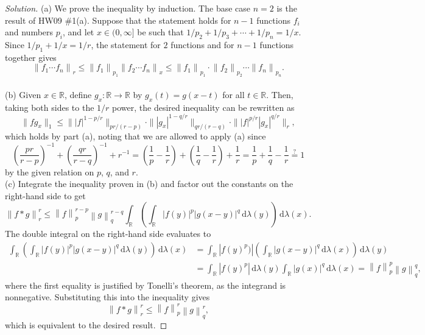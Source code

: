 \documentclass[10pt]{article}
\newcommand{\dd}{\,\mathrm{d}}
\providecommand{\RR}{\mathbb R}
\providecommand{\inv}{^{-1}}
\newenvironment{soln}{\begin{proof}[Solution]}{\end{proof}}
\providecommand{\abs}[1]{\left\lvert #1\right\rvert}
\providecommand{\norm}[1]{\left\| #1\right\|}
\providecommand{\smnorm}[1]{\| #1\|}
\begin{document}
\begin{soln}
    (a) We prove the inequality by induction. The base case $n=2$
    is the result of HW09 \#1(a). Suppose that the statement holds
    for $n - 1$ functions $f_i$ and numbers $p_i$,
    and let $x\in(0,\infty]$ be such that
    $1/{p_2} + 1/{p_3} + \cdots + 1/{p_n} = 1/x$. Since $1/p_1 + 1/x = 1/r$,
    the statement for $2$ functions and for $n-1$ functions together gives
    \begin{equation*}
	\norm{f_1\cdots f_n}_r \le \norm{f_1}_{p_1}\norm{f_2\cdots f_n}_{x}
	\le \norm{f_1}_{p_1}\cdot \norm{f_2}_{p_2}\cdots\norm{f_n}_{p_n}.
    \end{equation*}
    \\

    (b) Given $x\in\RR$, define $g_x\colon\RR\to\RR$ by
    $g_x(t) = g(x-t)$ for all $t\in\RR$. Then, taking both sides to the $1/r$ power,
    the desired inequality can be rewritten as
    \begin{equation*}
	\smnorm{fg_x}_1 \le \smnorm{\abs{f}^{1-p/r}}_{pr/(r-p)}\cdot
	\smnorm{\abs{g_x}^{1-q/r}}_{qr/(r-q)}\cdot
	\smnorm{\abs{f}^{p/r}\abs{g_x}^{q/r}}_{r},
    \end{equation*}
    which holds by part (a), noting that we are allowed to apply (a) since
    \begin{equation*}
        \left(\frac{pr}{r-p}\right)\inv + \left(\frac{qr}{r-q}\right)\inv + r\inv
	= \left(\frac 1p - \frac 1r\right) + \left(\frac 1q - \frac 1r\right)
	+ \frac 1r = \frac 1p + \frac 1q - \frac 1r \overset?= 1
    \end{equation*}
    by the given relation on $p$, $q$, and $r$.
    \\

    (c) Integrate the inequality proven in (b)
    and factor out the constants on the right-hand side to get
    \begin{equation*}
	\norm{f*g}_r^r \le
	\norm{f}_p^{r-p}\norm{g}_q^{r-q} \int_\RR\left(
	\int_\RR\abs{f(y)}^p\abs{g(x-y)}^q\dd\lambda(y)\right)\dd\lambda(x).
    \end{equation*}
    The double integral on the right-hand side evaluates to
    \begin{align*}
        \int_\RR\left(\int_\RR\abs{f(y)}^p
	\abs{g(x-y)}^q\dd\lambda(y)\right)\dd\lambda(x)
	&= \int_\RR\abs{f(y)^p)}\left(
	\int_\RR\abs{g(x-y)}^q\dd\lambda(x)\right)\dd\lambda(y)\\
	&= \int_\RR\abs{f(y)^p}\dd\lambda(y)\int_\RR\abs{g(x)}^q\dd\lambda(x)
	= \norm{f}_p^p\norm{g}_q^q,
    \end{align*}
    where the first equality is justified by Tonelli's theorem,
    as the integrand is nonnegative. Substituting this into the inequality gives
    \begin{equation*}
	\norm{f*g}_r^r \le \norm{f}_p^r\norm{g}_q^r,
    \end{equation*}
    which is equivalent to the desired result.
\end{soln}
\end{document}
